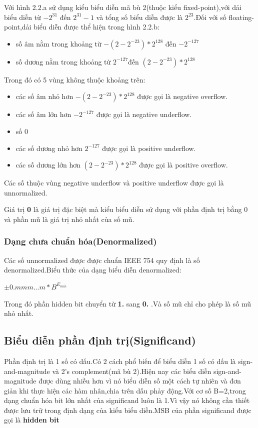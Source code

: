 \documentclass[11pt,a4paper,vietnamese]{report}
\begin{document}
Với hình 2.2.a sử dụng kiểu biểu diễn mã bù 2(thuộc kiểu fixed-point),với dải biểu diễn từ $-2^{31}$ đến $2^{31}-1$ và tổng số biểu diễn được là $2^{23}$.Đối với số floating-point,dải biểu diễn được thể hiện trong hình 2.2.b:
\begin{itemize}
\item số âm nằm trong khoảng từ $-(2-2^{-23})*2^{128}$ đến $-2^{-127}$
\item số dương nằm trong khoảng từ $2^{-127}$đến $(2-2^{-23})*2^{128}$
\end{itemize}
Trong đó có 5 vùng không thuộc khoảng trên:
\begin{itemize}
\item các số âm nhỏ hơn $-(2-2^{-23})*2^{128}$ được gọi là negative overflow.
\item các số âm lớn hơn $-2^{-127}$ được gọi là negative underflow.
\item số 0
\item các số dương nhỏ hơn $2^{-127}$ được gọi là positive underflow.
\item các số dương lớn hơn $(2-2^{-23})*2^{128}$ được gọi là positive overflow.
\end{itemize}
Các số thuộc vùng negative underflow và positive underflow được gọi là unnormalized.

Giá trị \textbf{0} là giá trị đặc biệt mà kiểu biểu diễn sử dụng với phần định trị bằng 0 và phần mũ là giá trị nhỏ nhất của số mũ.
\subsubsection{Dạng chưa chuẩn hóa(Denormalized)}
Các số unnormalized được được chuẩn IEEE 754 quy định là số denormalized.Biểu thức của dạng biểu diễn denormalized:
\begin{center}
$\pm{0.mmm...m}*B^{E_{min}}$
\end{center}
Trong đó phần hidden bit chuyển từ \textbf{1.} sang \textbf{0.} .Và số mũ chỉ cho phép là số mũ nhỏ nhất.
\subsection{Biểu diễn phần định trị(Significand)}
Phần định trị là 1 số có dấu.Có 2 cách phổ biến để biểu diễn 1 số có dấu là sign-and-magnitude và 2's complement(mã bù 2).Hiện nay các biểu diễn sign-and-magnitude được dùng nhiều hơn vì nó biểu diễn số một cách tự nhiên và đơn giản khi thực hiện các hàm nhân,chia trên dấu phảy động.Với cơ số B=2,trong dạng chuẩn hóa bit lớn nhất của significand luôn là 1.Vì vậy nó không cần thiết được lưu trữ trong định dạng của kiểu biểu diễn.MSB của phần significand được gọi là \textbf{hidden bit}
\end{document}
